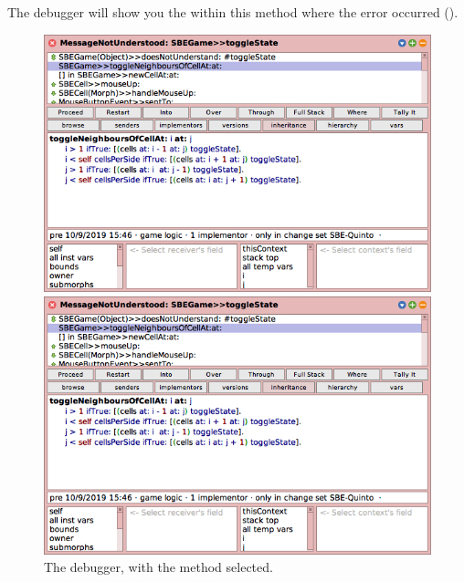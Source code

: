 \documentclass[a4paper,10pt,twoside]{book}
\begin{document}
The debugger will show you the  within this method where the error occurred ().

\begin{figure}[ht]
\ifluluelse
	{\centerline {\includegraphics[width=\textwidth]{Debugger}}}
	{\centerline {\includegraphics[scale=0.7]{Debugger}}}
\caption{The debugger, with the method   selected.
\label{fig:debugToggle}}
\end{figure}
\end{document}
